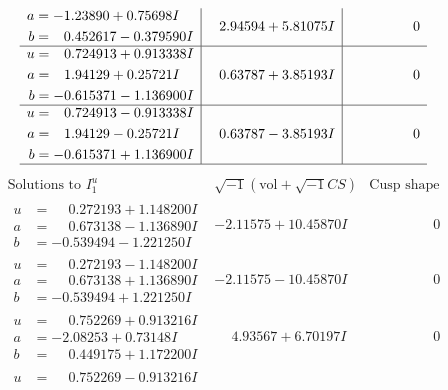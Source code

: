 \documentclass[1p]{elsarticle_modified}
\theoremstyle{definition}
\newcommand{\I}{\sqrt{-1}}
\begin{document}
$$\begin{array}{c|c|c}
\begin{aligned}
a &= -1.23890 + 0.75698 I \\
b &= \phantom{-}0.452617 - 0.379590 I\end{aligned}
 & \phantom{-}2.94594 + 5.81075 I & \phantom{-0.000000 } 0 \\ \hline\begin{aligned}
u &= \phantom{-}0.724913 + 0.913338 I \\
a &= \phantom{-}1.94129 + 0.25721 I \\
b &= -0.615371 - 1.136900 I\end{aligned}
 & \phantom{-}0.63787 + 3.85193 I & \phantom{-0.000000 } 0 \\ \hline\begin{aligned}
u &= \phantom{-}0.724913 - 0.913338 I \\
a &= \phantom{-}1.94129 - 0.25721 I \\
b &= -0.615371 + 1.136900 I\end{aligned}
 & \phantom{-}0.63787 - 3.85193 I & \phantom{-0.000000 } 0\\
 \hline 
 \end{array}$$\newpage$$\begin{array}{c|c|c}  
\text{Solutions to }I^u_{1}& \I (\text{vol} + \sqrt{-1}CS) & \text{Cusp shape}\\
 \hline 
\begin{aligned}
u &= \phantom{-}0.272193 + 1.148200 I \\
a &= \phantom{-}0.673138 - 1.136890 I \\
b &= -0.539494 - 1.221250 I\end{aligned}
 & -2.11575 + 10.45870 I & \phantom{-0.000000 } 0 \\ \hline\begin{aligned}
u &= \phantom{-}0.272193 - 1.148200 I \\
a &= \phantom{-}0.673138 + 1.136890 I \\
b &= -0.539494 + 1.221250 I\end{aligned}
 & -2.11575 - 10.45870 I & \phantom{-0.000000 } 0 \\ \hline\begin{aligned}
u &= \phantom{-}0.752269 + 0.913216 I \\
a &= -2.08253 + 0.73148 I \\
b &= \phantom{-}0.449175 + 1.172200 I\end{aligned}
 & \phantom{-}4.93567 + 6.70197 I & \phantom{-0.000000 } 0 \\ \hline\begin{aligned}
u &= \phantom{-}0.752269 - 0.913216 I \\

\end{aligned}
\end{array}$$
\end{document}
